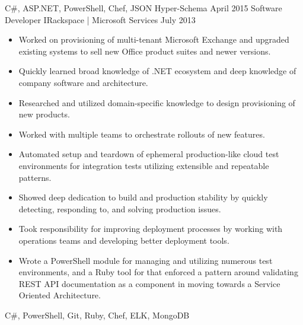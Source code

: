 \begin{experiences}
{                    }
                    {C\#, ASP.NET, PowerShell, Chef, JSON Hyper-Schema}
  \emptySeparator
  \experience
  {April 2015}       {Software Developer I}{Rackspace | Microsoft Services}
  {July 2013}        {
                      \begin{itemize}
                        \item Worked on provisioning of multi-tenant Microsoft Exchange and upgraded existing systems to sell new Office product suites and newer versions.
                        \item Quickly learned broad knowledge of .NET ecosystem and deep knowledge of company software and architecture.
                        \item Researched and utilized domain-specific knowledge to design provisioning of new products.
                        \item Worked with multiple teams to orchestrate rollouts of new features.
                        \item Automated setup and teardown of ephemeral production-like cloud test environments for integration tests utilizing extensible and repeatable patterns.
                        \item Showed deep dedication to build and production stability by quickly detecting, responding to, and solving production issues.
                        \item Took responsibility for improving deployment processes by working with operations teams and developing better deployment tools.
                        \item Wrote a PowerShell module for managing and utilizing numerous test environments, and a Ruby tool for that enforced a pattern around validating REST API documentation as a component in moving towards a Service Oriented Architecture.
                      \end{itemize}
                    }
                    {C\#, PowerShell, Git, Ruby, Chef, ELK, MongoDB}
\end{experiences}
